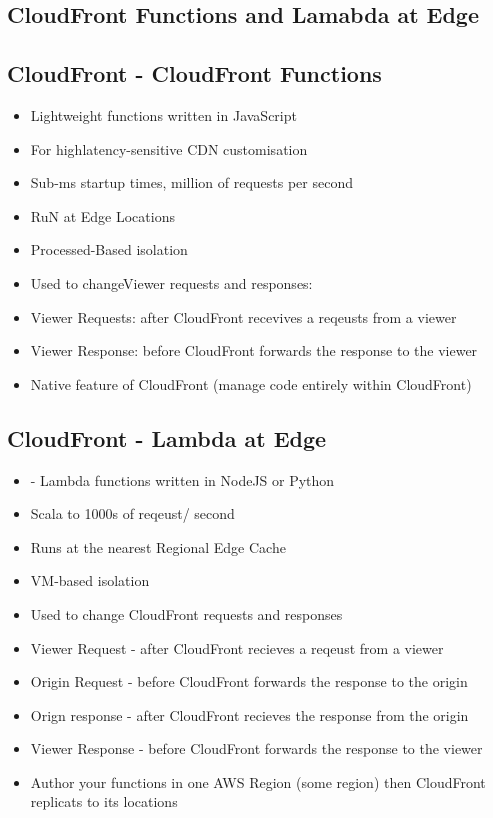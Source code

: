 \subsection{CloudFront Functions and Lamabda at Edge}

\subsection{CloudFront - CloudFront Functions}
\begin{itemize}
    \item Lightweight functions written in JavaScript
    \item For high\itemscale latency-sensitive CDN customisation
    \item Sub-ms startup times, million of requests per second
    \item RuN at Edge Locations
    \item Processed-Based isolation
    \item Used to changeViewer requests and responses:
    \item Viewer Requests: after CloudFront recevives a reqeusts from a viewer
    \item Viewer Response: before CloudFront forwards the response to the viewer
    \item Native feature of CloudFront (manage code entirely within CloudFront)
\end{itemize}

\subsection{CloudFront - Lambda at Edge}
\begin{itemize}
    \item - Lambda functions written in NodeJS or Python
    \item Scala to 1000s of reqeust/ second
    \item Runs at the nearest Regional Edge Cache
    \item VM-based isolation
    \item Used to change CloudFront requests and responses
    \item Viewer Request - after CloudFront recieves a reqeust from a viewer
    \item Origin Request - before CloudFront forwards the response to the origin
    \item Orign response - after CloudFront recieves the response from the origin
    \item Viewer Response - before CloudFront forwards the response to the viewer
    \item Author your functions in one AWS Region (some region) then CloudFront replicats to its locations
\end{itemize}

